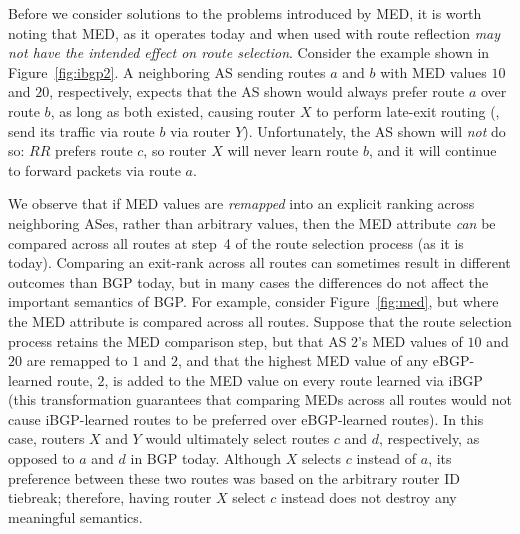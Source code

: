 Before we consider solutions to the problems introduced by MED, it is
worth noting that MED, as it operates today and when used with
route reflection {\em may not have the intended effect on route selection}.
Consider the example shown in Figure~\ref{fig:ibgp2}.  A neighboring AS
sending routes $a$ and $b$ with MED values $10$ and $20$, respectively,
expects that the AS shown would always prefer route $a$ over route $b$,
as long as both existed, causing router $X$ to perform late-exit routing
(\ie, send its traffic via route $b$ via router $Y$).  Unfortunately,
the AS shown will {\em not} do so: $RR$ prefers route $c$, so router $X$
will never learn route $b$, and it will continue to forward packets via
route $a$.

We observe that if MED values are {\em remapped} into an explicit
ranking across neighboring ASes, rather than arbitrary values, then the MED
attribute 
{\em can} be compared across all routes at step~4 of the route selection
process (as it is today).  Comparing an exit-rank across
all routes can sometimes result in different outcomes than BGP today,
but in many cases the differences do not affect the important semantics
of BGP.  For example, consider Figure~\ref{fig:med}, but where the MED
attribute is compared across all routes.  Suppose that the route
selection process retains the MED comparison step, but that AS 2's MED
values of $10$ and $20$ are remapped to $1$ and $2$, and that the
highest MED value of any eBGP-learned route, $2$, is added to the MED
value on every route learned via iBGP (this transformation guarantees
that comparing MEDs across all routes would not cause iBGP-learned
routes to be preferred over eBGP-learned routes).  In this case, routers
$X$ and $Y$ would ultimately select routes $c$ and $d$, respectively, as
opposed to $a$ and $d$ in BGP today.  Although $X$ selects $c$ instead
of $a$, its preference between these two routes was based on the
arbitrary router ID tiebreak; therefore, having router $X$ select $c$
instead does not destroy any meaningful semantics.

